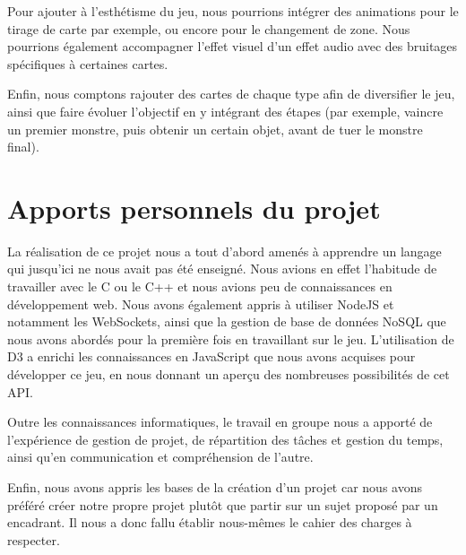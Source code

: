 \documentclass[12pt]{report}
\begin{document}
    Pour ajouter à l'esthétisme du jeu, nous pourrions intégrer des animations pour le tirage de carte par exemple, ou encore pour le changement de zone. Nous pourrions également accompagner l'effet visuel d'un effet audio avec des bruitages spécifiques à certaines cartes.

    Enfin, nous comptons rajouter des cartes de chaque type afin de diversifier le jeu, ainsi que faire évoluer l'objectif en y intégrant des étapes (par exemple, vaincre un premier monstre, puis obtenir un certain objet, avant de tuer le monstre final).

    \section*{Apports personnels du projet}

    La réalisation de ce projet nous a tout d'abord amenés à apprendre un langage qui jusqu'ici ne nous avait pas été enseigné. Nous avions en effet l'habitude de travailler avec le C ou le C++ et nous avions peu de connaissances en développement web. Nous avons également appris à utiliser NodeJS et notamment les WebSockets, ainsi que la gestion de base de données NoSQL que nous avons abordés pour la première fois en travaillant sur le jeu. L'utilisation de D3 a enrichi les connaissances en JavaScript que nous avons acquises pour développer ce jeu, en nous donnant un aperçu des nombreuses possibilités de cet API.

    Outre les connaissances informatiques, le travail en groupe nous a apporté de l'expérience de gestion de projet, de répartition des tâches et gestion du temps, ainsi qu'en communication et compréhension de l'autre.

    Enfin, nous avons appris les bases de la création d'un projet car nous avons préféré créer notre propre projet plutôt que partir sur un sujet proposé par un encadrant. Il nous a donc fallu établir nous-mêmes le cahier des charges à respecter.
\end{document}
